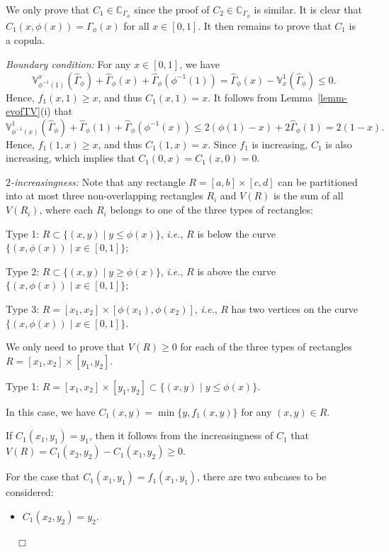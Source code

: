 \documentclass[10pt,a4paper]{amsart}
\renewenvironment{proof}{\noindent{\bf Proof.}}{~~$\Box$}
\begin{document}
\begin{proof}
We only prove that $C_1\in \mathbb{C}_{\Gamma_\phi}$ since the proof of $C_2\in \mathbb{C}_{\Gamma_\phi}$ is similar.
It is clear that $C_{1}(x, \phi(x))=\Gamma_\phi(x)$ for all $x\in[0, 1]$. It then remains to prove that $C_1$ is a copula.

\emph{Boundary condition:} For any $x\in[0, 1]$, we have
\[
\mathbb{V}^{x}_{\phi^{-1}(1)}(\hat{\Gamma}_{\phi})+\hat{\Gamma}_{\phi}(x)+\hat{\Gamma}_{\phi}(\phi^{-1}(1))
=\hat{\Gamma}_{\phi}(x)-\mathbb{V}^{1}_{x}(\hat{\Gamma}_{\phi})\leq 0.
\]
Hence, $f_1(x, 1)\geq x$, and thus $C_1(x, 1)=x$. It follows from Lemma~\ref{lemm-evofTV}(i) that
\[
\mathbb{V}^{1}_{\phi^{-1}(x)}(\hat{\Gamma}_{\phi})+\hat{\Gamma}_{\phi}(1)+\hat{\Gamma}_{\phi}(\phi^{-1}(x))\leq 2(\phi(1)-x)+2\hat{\Gamma}_{\phi}(1)=2(1-x).
\]
Hence, $f_1(1, x)\geq x$, and thus $C_1(1, x)=x$. Since $f_1$ is increasing, $C_1$ is also increasing, which implies that
$C_1(0, x)=C_1(x, 0)=0$.

\emph{$2$-increasingness:} Note that any rectangle $R=[a, b]\times [c, d]$ can be partitioned into at most three non-overlapping rectangles $R_i$ and $V(R)$ is the sum of all $V(R_i)$,
where each $R_i$ belongs to one of the three types of rectangles:

\noindent Type 1: $R\subset\{(x, y)\mid y\leq\phi(x)\}$, \emph{i.e.}, $R$ is below the curve $\{(x, \phi(x))\mid x\in [0, 1]\}$;

\noindent Type 2: $R\subset\{(x, y)\mid y\geq\phi(x)\}$, \emph{i.e.}, $R$ is above the curve $\{(x, \phi(x))\mid x\in [0, 1]\}$;

\noindent Type 3: $R=[x_1, x_2]\times [\phi(x_1), \phi(x_2)]$, \emph{i.e.}, $R$ has two vertices on the curve $\{(x, \phi(x))\mid x\in [0, 1]\}$.

\noindent We only need to prove that $V(R)\geq 0$ for each of the three types of rectangles $R=[x_1, x_2]\times [y_1, y_2]$.

\noindent Type 1: $R=[x_1, x_2]\times[y_1, y_2]\subset\{(x, y)\mid y\leq\phi(x)\}$.

In this case, we have $C_{1}(x, y)=\min\{y, f_1(x, y)\}$ for any $(x, y)\in R$.

If $C_1(x_1, y_1)=y_1$, then it follows from the increasingness of $C_1$ that $V(R)=C_1(x_2, y_2)-C_1(x_1, y_2)\geq 0$.

For the case that $C_1(x_1, y_1)=f_1(x_1, y_1)$, there are two subcases to be considered:
\begin{itemize}%
\item[\rm (a)] $C_1(x_2, y_2)=y_2$.


\end{itemize}
\end{proof}
\end{document}
